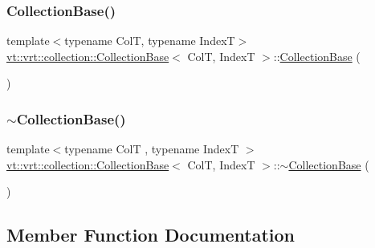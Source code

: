 \subsubsection{\texorpdfstring{Collection\+Base()}{CollectionBase()}}
{\footnotesize\ttfamily template$<$typename ColT, typename IndexT$>$ \\
\hyperlink{structvt_1_1vrt_1_1collection_1_1_collection_base}{vt\+::vrt\+::collection\+::\+Collection\+Base}$<$ ColT, IndexT $>$\+::\hyperlink{structvt_1_1vrt_1_1collection_1_1_collection_base}{Collection\+Base} (\begin{DoxyParamCaption}{ }\end{DoxyParamCaption})\hspace{0.3cm}{\ttfamily [default]}}

\mbox{\label{structvt_1_1vrt_1_1collection_1_1_collection_base_aa343e5527cb05addb8bbb04994ebc23e}} 
\subsubsection{\texorpdfstring{$\sim$\+Collection\+Base()}{~CollectionBase()}}
{\footnotesize\ttfamily template$<$typename ColT , typename IndexT $>$ \\
\hyperlink{structvt_1_1vrt_1_1collection_1_1_collection_base}{vt\+::vrt\+::collection\+::\+Collection\+Base}$<$ ColT, IndexT $>$\+::$\sim$\hyperlink{structvt_1_1vrt_1_1collection_1_1_collection_base}{Collection\+Base} (\begin{DoxyParamCaption}{ }\end{DoxyParamCaption})\hspace{0.3cm}{\ttfamily [virtual]}}



\subsection{Member Function Documentation}
\mbox{\label{structvt_1_1vrt_1_1collection_1_1_collection_base_ad97d9ab1a28fb535c5d7f82c15e99791}} 
